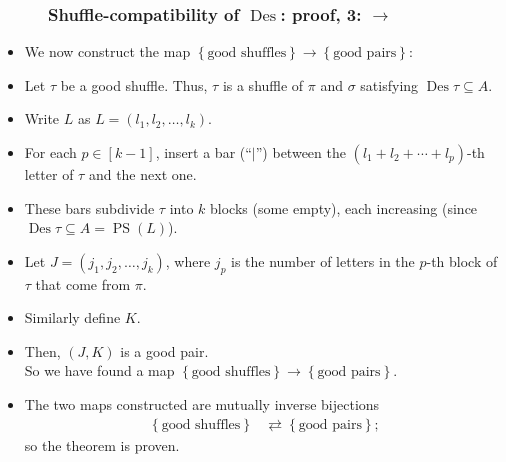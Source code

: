 \documentclass{beamer}
\newcommand{\Des}{\operatorname{Des}}
\newcommand{\PS}{\operatorname{PS}}
\newcommand{\fti}[1]{\frametitle{\ \ \ \ \ #1}}
\newcommand{\set}[1]{\left\{ #1 \right\}}
\newcommand{\tup}[1]{\left( #1 \right)}
\newcommand{\ive}[1]{\left[ #1 \right]}
\theoremstyle{plain}
\begin{document}
\begin{frame}
\begin{itemize}
\end{itemize}

\vspace{10cm}
\end{frame}

\begin{frame}
\fti{Shuffle-compatibility of $\Des$: proof, 3: $\rightarrow$}

\begin{itemize}

\item We now construct the map
      $\set{\text{good shuffles}} \to \set{\text{good pairs}}$:

\item Let $\tau$ be a good shuffle. Thus,
      $\tau$ is a shuffle of $\pi$ and $\sigma$ satisfying
      $\Des \tau \subseteq A$.

\pause

\item Write $L$ as $L = \tup{l_1, l_2, \ldots, l_k}$.

\pause

\item For each $p \in \ive{k-1}$, insert a bar (``$\mid$'') between
      the $\tup{l_1+l_2+\cdots+l_p}$-th letter of $\tau$
      and the next one.

\pause

\item These bars subdivide $\tau$ into $k$ blocks (some empty),
      each increasing (since $\Des \tau \subseteq A = \PS \tup{L}$).

\pause

\item Let $J = \tup{j_1, j_2, \ldots, j_k}$, where $j_p$ is
      the number of letters in the $p$-th block of $\tau$
      that come from $\pi$.

\pause

\item Similarly define $K$.

\pause

\item Then, $\tup{J, K}$ is a good pair.
      \pause \\
      So we have found a map
      $\set{\text{good shuffles}} \to \set{\text{good pairs}}$.

\pause

\item The two maps constructed are mutually inverse bijections
      \begin{align*}
               \set{\text{good shuffles}}
               &\rightleftarrows
               \set{\text{good pairs}} ;
      \end{align*}
      so the theorem is proven.

\end{itemize}

\vspace{10cm}
\end{frame}
\end{document}
